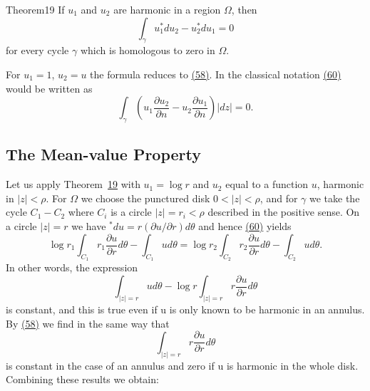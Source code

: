 \begin{originalstatement}{Theorem}{19}\label{thm:4.19}
If $u_{1}$ and $u_{2}$ are harmonic in a region $\Omega$, then
\begin{equation*}
\int_ {\gamma} u _ {1} ^ {*} d u _ {2} - u _ {2} ^ {*} d u _ {1} = 0\tag{60}\label{eq:4.60-p180-b14}
\end{equation*}
for every cycle $\gamma$ which is homologous to zero in $\Omega$.

\end{originalstatement}
For $u_{1} = 1$, $u_{2} = u$ the formula reduces to \hyperref[eq:4.58]{(58)}. In the classical notation \hyperref[eq:4.60]{(60)} would be written as
\begin{equation*}
\int_ {\gamma} \left(u _ {1} \frac {\partial u _ {2}}{\partial n} - u _ {2} \frac {\partial u _ {1}}{\partial n}\right) | d z | = 0.
\end{equation*}
\setcounter{section}{6}\setcounter{subsection}{1}\subsection{The Mean-value Property}\label{sec:4.6.2}
Let us apply Theorem~\hyperref[thm:4.19]{19} with $u_{1} = \log r$ and $u_{2}$ equal to a function $u$, harmonic in $|z| < \rho$. For $\Omega$ we choose the punctured disk $0 < |z| < \rho$, and for $\gamma$ we take the cycle $C_{1} - C_{2}$ where $C_{i}$ is a circle $|z| = r_{i} < \rho$ described in the positive sense. On a circle $|z| = r$ we have $^{*}du = r(\partial u / \partial r) d\theta$ and hence \hyperref[eq:4.60]{(60)} yields
\begin{equation*}
\log r _ {1} \int_ {C _ {1}} r _ {1} \frac {\partial u}{\partial r} d \theta - \int_ {C _ {1}} u d \theta = \log r _ {2} \int_ {C _ {2}} r _ {2} \frac {\partial u}{\partial r} d \theta - \int_ {C _ {2}} u d \theta .
\end{equation*}
In other words, the expression
\begin{equation*}
\int_ {| z | = r} u d \theta - \log r \int_ {| z | = r} r \frac {\partial u}{\partial r} d \theta
\end{equation*}
is constant, and this is true even if u is only known to be harmonic in an annulus. By \hyperref[eq:4.58]{(58)} we find in the same way that
\begin{equation*}
\int_ {| z | = r} r \frac {\partial u}{\partial r} d \theta
\end{equation*}
is constant in the case of an annulus and zero if u is harmonic in the whole disk. Combining these results we obtain:

